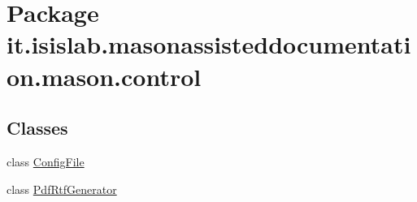 \hypertarget{namespaceit_1_1isislab_1_1masonassisteddocumentation_1_1mason_1_1control}{\section{Package it.\-isislab.\-masonassisteddocumentation.\-mason.\-control}
\label{namespaceit_1_1isislab_1_1masonassisteddocumentation_1_1mason_1_1control}
}
\subsection*{Classes}
\begin{DoxyCompactItemize}
\item 
class \hyperlink{classit_1_1isislab_1_1masonassisteddocumentation_1_1mason_1_1control_1_1_config_file}{Config\-File}
\item 
class \hyperlink{classit_1_1isislab_1_1masonassisteddocumentation_1_1mason_1_1control_1_1_pdf_rtf_generator}{Pdf\-Rtf\-Generator}
\end{DoxyCompactItemize}
